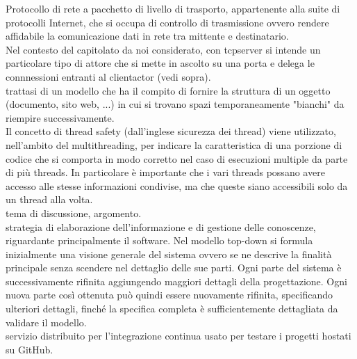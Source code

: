 \documentclass{scalatekids-article}
\begin{document}
   Protocollo di rete a pacchetto di livello di trasporto, appartenente alla suite di protocolli Internet, che si occupa di controllo di trasmissione ovvero rendere affidabile la comunicazione dati in rete tra mittente e destinatario. 
  \\

   Nel contesto del capitolato da noi considerato, con tcpserver si intende un particolare tipo di attore che si mette in ascolto su una porta e delega le connnessioni entranti al clientactor (vedi sopra).
  \\

   trattasi di un modello che ha il compito di fornire la struttura di un oggetto (documento, sito web, ...) in cui si trovano spazi temporaneamente "bianchi" da riempire successivamente.
  \\

   Il concetto di thread safety (dall'inglese sicurezza dei thread) viene utilizzato, nell'ambito del multithreading, per indicare la caratteristica di una porzione di codice che si comporta in modo corretto nel caso di esecuzioni multiple da parte di più threads. In particolare è importante che i vari threads possano avere accesso alle stesse informazioni condivise, ma che queste siano accessibili solo da un thread alla volta.
  \\

   tema di discussione, argomento.
  \\

   strategia di elaborazione dell'informazione e di gestione delle conoscenze, riguardante principalmente il software.
  Nel modello top-down si formula inizialmente una visione generale del sistema ovvero se ne descrive la finalità principale senza scendere nel dettaglio delle sue parti. Ogni parte del sistema è successivamente rifinita aggiungendo maggiori dettagli della progettazione. Ogni nuova parte così ottenuta può quindi essere nuovamente rifinita, specificando ulteriori dettagli, finché la specifica completa è sufficientemente dettagliata da validare il modello.
  \\

   servizio distribuito per l'integrazione continua usato per testare i progetti hostati su GitHub.
  \\

\end{document}
